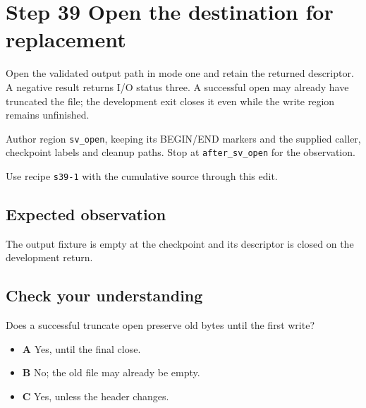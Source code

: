 \section{Step 39 Open the destination for replacement}\label{ppm-s39}

Open the validated output path in mode one and retain the returned descriptor. A negative result returns I/O status three. A successful open may already have truncated the file; the development exit closes it even while the write region remains unfinished.

Author region \texttt{sv\_open}, keeping its BEGIN/END markers and the supplied caller, checkpoint labels and cleanup paths. Stop at \texttt{after\_sv\_open} for the observation.

Use recipe \texttt{s39-1} with the cumulative source through this edit.

\subsection{Expected observation}
The output fixture is empty at the checkpoint and its descriptor is closed on the development return.

\subsection{Check your understanding}
Does a successful truncate open preserve old bytes until the first write?

\begin{itemize}
  \item \textbf{A} Yes, until the final close.
  \item \textbf{B} No; the old file may already be empty.
  \item \textbf{C} Yes, unless the header changes.
\end{itemize}
